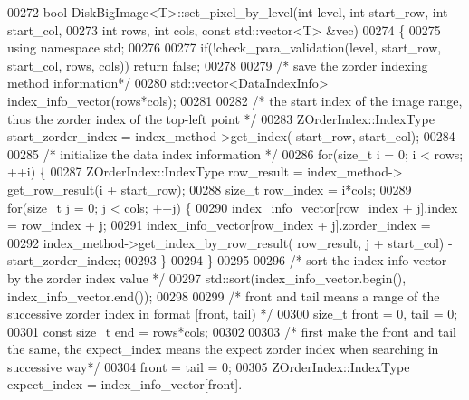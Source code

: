 \begin{DoxyCode}
00272 \textcolor{keywordtype}{bool} DiskBigImage<T>::set_pixel_by_level(\textcolor{keywordtype}{int} level, \textcolor{keywordtype}{int} start\_row, \textcolor{keywordtype}{int} 
      start\_col, 
00273         \textcolor{keywordtype}{int} rows, \textcolor{keywordtype}{int} cols, \textcolor{keyword}{const} std::vector<T> &vec)
00274 \{       
00275         \textcolor{keyword}{using namespace }std;
00276 
00277         \textcolor{keywordflow}{if}(!check\_para\_validation(level, start\_row, start\_col, rows, cols)) \textcolor{keywordflow}{
      return} \textcolor{keyword}{false};
00278 
00279         \textcolor{comment}{/* save the zorder indexing method information*/}
00280         std::vector<DataIndexInfo> index\_info\_vector(rows*cols);
00281 
00282         \textcolor{comment}{/* the start index of the image range, thus the zorder index of the
       top-left point */}
00283         ZOrderIndex::IndexType start\_zorder\_index = index\_method->get\_index(
      start\_row, start\_col);
00284 
00285         \textcolor{comment}{/* initialize the data index information */} 
00286         \textcolor{keywordflow}{for}(\textcolor{keywordtype}{size\_t} i = 0; i < rows; ++i) \{
00287                 ZOrderIndex::IndexType row\_result = index\_method->
      get\_row\_result(i + start\_row);
00288                 \textcolor{keywordtype}{size\_t} row\_index = i*cols;      
00289                 \textcolor{keywordflow}{for}(\textcolor{keywordtype}{size\_t} j = 0; j < cols; ++j) \{
00290                         index\_info\_vector[row\_index + j].index = row\_index + j;
00291                         index\_info\_vector[row\_index + j].zorder\_index = 
00292                                 index\_method->get\_index\_by\_row\_result(
      row\_result, j + start\_col) - start\_zorder\_index; 
00293                 \}
00294         \}
00295 
00296         \textcolor{comment}{/* sort the index info vector by the zorder index value */}
00297         std::sort(index\_info\_vector.begin(), index\_info\_vector.end());
00298 
00299         \textcolor{comment}{/* front and tail means a range of the successive zorder index in
       format [front, tail) */}
00300         \textcolor{keywordtype}{size\_t} front = 0, tail = 0;
00301         \textcolor{keyword}{const} \textcolor{keywordtype}{size\_t} end = rows*cols;  
00302 
00303         \textcolor{comment}{/* first make the front and tail the same, the expect\_index means the
       expect zorder index when searching in successive way*/}
00304         front = tail = 0;
00305         ZOrderIndex::IndexType expect\_index = index\_info\_vector[front].

\end{DoxyCode}
